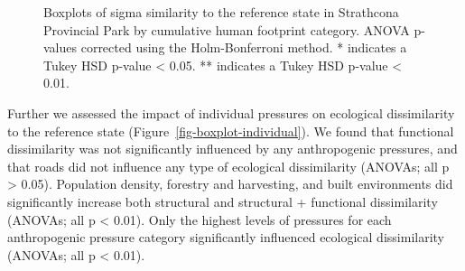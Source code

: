 \documentclass[
]{agujournal2019}
\begin{document}
\label{cell-fig-boxplot-overall}
\begin{figure}[H]


\caption{\label{fig-boxplot-overall}Boxplots of sigma similarity to the
reference state in Strathcona Provincial Park by cumulative human
footprint category. ANOVA p-values corrected using the Holm-Bonferroni
method. * indicates a Tukey HSD p-value \textless{} 0.05. ** indicates a
Tukey HSD p-value \textless{} 0.01.}

\end{figure}%

Further we assessed the impact of individual pressures on ecological
dissimilarity to the reference state
(Figure~\ref{fig-boxplot-individual}). We found that functional
dissimilarity was not significantly influenced by any anthropogenic
pressures, and that roads did not influence any type of ecological
dissimilarity (ANOVAs; all p \textgreater{} 0.05). Population density,
forestry and harvesting, and built environments did significantly
increase both structural and structural + functional dissimilarity
(ANOVAs; all p \textless{} 0.01). Only the highest levels of pressures
for each anthropogenic pressure category significantly influenced
ecological dissimilarity (ANOVAs; all p \textless{} 0.01).
\end{document}
